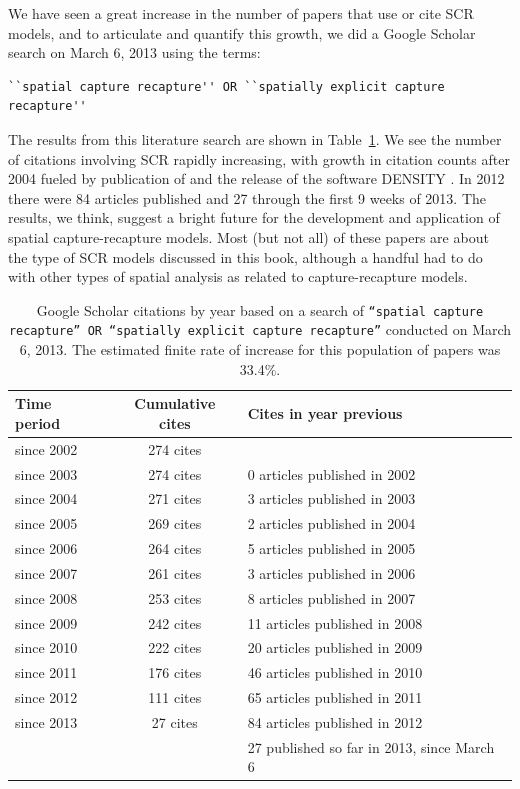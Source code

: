 We have seen a great increase in the number of papers that use or cite SCR models, and to
articulate and quantify this growth,
we did a Google Scholar search on
March 6, 2013 using the terms:
\begin{small}
\begin{verbatim}
``spatial capture recapture'' OR ``spatially explicit capture recapture''
\end{verbatim}
\end{small}
The results from this literature search are shown
 in Table~\ref{last.tab.cites}.
We see the number of citations involving SCR rapidly increasing,
with growth in citation counts after 2004 fueled by publication of
\citet{efford:2004} and the release of the software DENSITY
\citep{efford_etal:2004}. In 2012 there were 84 articles published and
27 through the first 9 weeks of 2013.
The results, we think, suggest a bright future
for the development and application of spatial capture-recapture
models. Most (but not all) of these papers are about the type of SCR models
discussed in this book, although a handful had to
do with other types of spatial analysis as related to
capture-recapture models.

\begin{table}[ht]
\caption{Google Scholar citations by year based on a search of
{\tt ``spatial capture recapture'' OR ``spatially explicit
capture recapture''} conducted on March 6, 2013. The estimated finite
rate of increase for this population of papers was 33.4\%.
}
\begin{tabular}{lcl} \hline \hline
Time period & Cumulative cites & Cites in year previous \\ \hline
since 2002 & 274 cites & \\
since 2003 & 274 cites &0 articles published in 2002 \\
since 2004 & 271 cites &3 articles published in 2003 \\
since 2005 & 269 cites &2 articles published in 2004 \\
since 2006 & 264 cites &5 articles published in 2005 \\
since 2007 & 261 cites &3 articles published in 2006 \\
since 2008 & 253 cites &8 articles published in 2007 \\
since 2009 & 242 cites &11 articles published in 2008 \\
since 2010 & 222 cites &20 articles published in 2009 \\
since 2011 & 176 cites &46 articles published in 2010 \\
since 2012 & 111 cites &65 articles published in 2011 \\
since 2013 & 27 cites &84 articles published in 2012 \\
& &27 published so far in 2013, since March 6
\\ \hline
\end{tabular}
\label{last.tab.cites}
\end{table}

